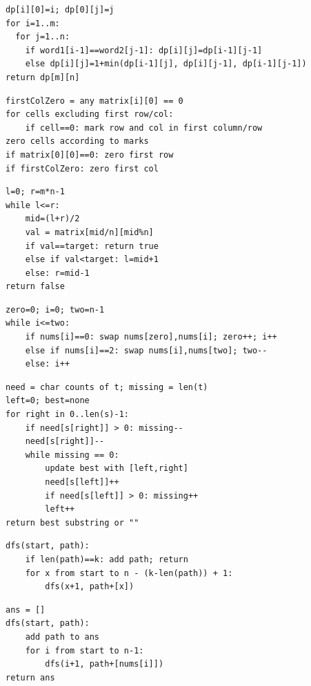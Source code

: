 \documentclass[11pt,a4paper]{ctexart}
\begin{document}
\begin{verbatim}
dp[i][0]=i; dp[0][j]=j
for i=1..m:
  for j=1..n:
    if word1[i-1]==word2[j-1]: dp[i][j]=dp[i-1][j-1]
    else dp[i][j]=1+min(dp[i-1][j], dp[i][j-1], dp[i-1][j-1])
return dp[m][n]
\end{verbatim}

\begin{verbatim}
firstColZero = any matrix[i][0] == 0
for cells excluding first row/col:
    if cell==0: mark row and col in first column/row
zero cells according to marks
if matrix[0][0]==0: zero first row
if firstColZero: zero first col
\end{verbatim}

\begin{verbatim}
l=0; r=m*n-1
while l<=r:
    mid=(l+r)/2
    val = matrix[mid/n][mid%n]
    if val==target: return true
    else if val<target: l=mid+1
    else: r=mid-1
return false
\end{verbatim}

\begin{verbatim}
zero=0; i=0; two=n-1
while i<=two:
    if nums[i]==0: swap nums[zero],nums[i]; zero++; i++
    else if nums[i]==2: swap nums[i],nums[two]; two--
    else: i++
\end{verbatim}

\begin{verbatim}
need = char counts of t; missing = len(t)
left=0; best=none
for right in 0..len(s)-1:
    if need[s[right]] > 0: missing--
    need[s[right]]--
    while missing == 0:
        update best with [left,right]
        need[s[left]]++
        if need[s[left]] > 0: missing++
        left++
return best substring or ""
\end{verbatim}

\begin{verbatim}
dfs(start, path):
    if len(path)==k: add path; return
    for x from start to n - (k-len(path)) + 1:
        dfs(x+1, path+[x])
\end{verbatim}

\begin{verbatim}
ans = []
dfs(start, path):
    add path to ans
    for i from start to n-1:
        dfs(i+1, path+[nums[i]])
return ans
\end{verbatim}
\end{document}
